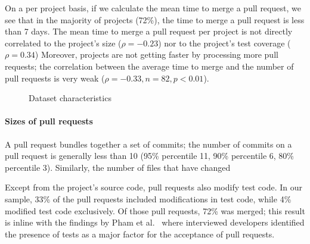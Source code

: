 \documentclass{sig-alternate}
\begin{document}
On a per project basis, if we calculate the mean time to merge a pull request,
we see that in the majority of projects (72\%), the time to merge a pull
request is less than 7 days. The mean time to merge a pull request per project
is not directly correlated to the project's size ($\rho = -0.23$) nor to the
project's test coverage ($\rho = 0.34$) Moreover, projects are not getting
faster by processing more pull requests; the correlation between the average
time to merge and the number of pull requests is very weak ($\rho = -0.33, n =
82, p < 0.01$).

\begin{figure*}
\centering
{}
\caption{Dataset characteristics}
\end{figure*}

\paragraph*{Sizes of pull requests}

A pull request bundles together a set of commits; the number of 
commits on a pull request is generally less than 10 (95\% percentile 11,
90\% percentile 6, 80\% percentile 3). Similarly, the number of 
files that have changed 



Except from the project's source code, pull requests also modify test
code. In our sample, 33\% of the pull requests included modifications
in test code, while 4\% modified test code exclusively. Of those
pull requests, 72\% was merged; this result is inline with the findings by
Pham et al.~\cite{Pham13} where interviewed developers identified 
the presence of tests as a major factor for the acceptance of pull requests.
\end{document}
